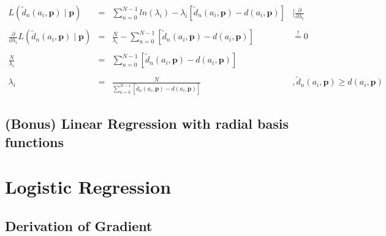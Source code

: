 \documentclass{article}
\begin{document}
\begin{itemize}
            	         
	     $\begin{array}{cccl}
	         L(\tilde{d}_n(a_i,\mathbf{p}) \mid \mathbf{p}) & = & \displaystyle \sum_{n=0}^{N-1} ln(\lambda_i) - \lambda_i [\tilde{d}_n(a_i,\mathbf{p}) - d(a_i,\mathbf{p})] & \mid \frac{\partial}{\partial\lambda_i} \\\\
	         \frac{\partial}{\partial\lambda_i} L(\tilde{d}_n(a_i,\mathbf{p}) \mid \mathbf{p}) & = & \frac{N}{\lambda_i} - \displaystyle \sum_{n=0}^{N-1}[\tilde{d}_n(a_i,\mathbf{p}) - d(a_i,\mathbf{p})] & \stackrel{!}{=} 0 \\\\
	         \frac{N}{\lambda_i} & = & \displaystyle \sum_{n=0}^{N-1} [\tilde{d}_n(a_i,\mathbf{p}) - d(a_i,\mathbf{p})] & \\\\
	         \lambda_i & = & \frac{N}{\displaystyle \sum_{n=0}^{N-1} [\tilde{d}_n(a_i,\mathbf{p}) - d(a_i,\mathbf{p})]} & ,\tilde{d}_n(a_i,\mathbf{p}) \geq d(a_i,\mathbf{p})
	     \end{array}$\\
	 
\end{itemize}

\subsection{(Bonus) Linear Regression with radial basis functions}


\section{Logistic Regression}

\subsection{Derivation of Gradient}
\end{document}

